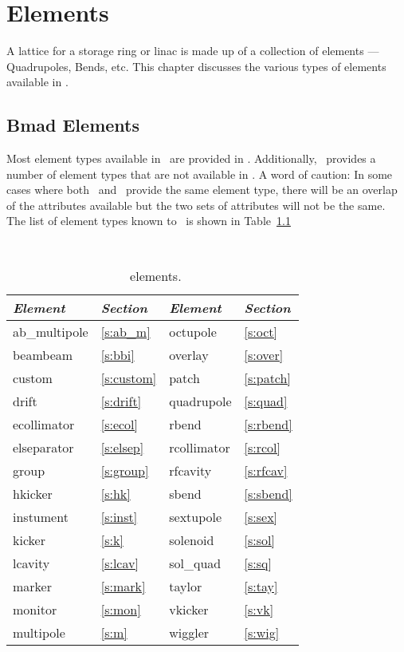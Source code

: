 \chapter{Elements}

A lattice for a storage ring or linac is made up of a collection of
elements --- Quadrupoles, Bends, etc. This chapter discusses the
various types of elements available in \bmad.

\section{Bmad Elements}

Most element types available in \mad\ are provided in \bmad.
Additionally, \bmad\ provides a number of element types that are not
available in \mad.  A word of caution: In some cases where both \mad\
and \bmad\ provide the same element type, there will be an overlap of 
the attributes available but the two sets of attributes will not be the same.
The list of element types known to \bmad\ is shown in Table~\ref{tab:elements}
\begin{table}[h]
\centering
{\tt
\begin{tabular}{|l|l||l|l|} \hline
  {\it Element} & {\it Section}  & {\it Element} & {\it Section} \\ \hline
  ab\_multipole & \ref{s:ab_m}   &  octupole     & \ref{s:oct}   \\ \hline
  beambeam      & \ref{s:bbi}    &  overlay      & \ref{s:over}  \\ \hline
  custom        & \ref{s:custom} &  patch        & \ref{s:patch} \\ \hline
  drift         & \ref{s:drift}  &  quadrupole   & \ref{s:quad}  \\ \hline
  ecollimator   & \ref{s:ecol}   &  rbend        & \ref{s:rbend} \\ \hline
  elseparator   & \ref{s:elsep}  &  rcollimator  & \ref{s:rcol}  \\ \hline
  group         & \ref{s:group}  &  rfcavity     & \ref{s:rfcav} \\ \hline
  hkicker       & \ref{s:hk}     &  sbend        & \ref{s:sbend} \\ \hline
  instument     & \ref{s:inst}   &  sextupole    & \ref{s:sex}   \\ \hline
  kicker        & \ref{s:k}      &  solenoid     & \ref{s:sol}   \\ \hline
  lcavity       & \ref{s:lcav}   &  sol\_quad    & \ref{s:sq}    \\ \hline
  marker        & \ref{s:mark}   &  taylor       & \ref{s:tay}   \\ \hline
  monitor       & \ref{s:mon}    &  vkicker      & \ref{s:vk}    \\ \hline
  multipole     & \ref{s:m}      &  wiggler      & \ref{s:wig}   \\ \hline
\end{tabular}}
\caption{\bmad\ elements.}
\label{tab:elements}\center
\end{table}

